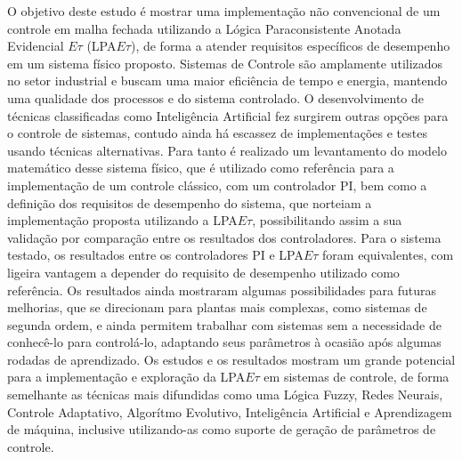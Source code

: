 





O objetivo deste estudo é mostrar uma implementação não convencional
de um controle em malha fechada utilizando a Lógica Paraconsistente
Anotada Evidencial $E\tau$ (LPA$E\tau$),
de forma a atender requisitos específicos de desempenho em um sistema físico proposto.
Sistemas de Controle são amplamente utilizados no setor industrial e
buscam uma maior eficiência de tempo e energia, mantendo uma qualidade
dos processos e do sistema controlado.
O desenvolvimento de técnicas classificadas como Inteligência
Artificial fez surgirem outras opções para o controle de sistemas,
contudo ainda há escassez de implementações e testes usando técnicas alternativas.
Para tanto é realizado um levantamento do modelo matemático desse
sistema físico, que é utilizado como referência para a implementação de um
controle clássico, com um controlador PI, bem como a definição dos
requisitos de desempenho do sistema, que norteiam a implementação
proposta utilizando a LPA$E\tau$, possibilitando assim a sua validação
por comparação entre os resultados dos controladores. 
Para o sistema testado,
os resultados entre os controladores
PI e LPA$E\tau$ foram equivalentes,
com ligeira vantagem a depender do
requisito de desempenho utilizado como referência.
Os resultados ainda mostraram algumas
possibilidades para futuras melhorias,
que se direcionam para plantas mais complexas,
como sistemas de segunda ordem,
e ainda permitem trabalhar com sistemas
sem a necessidade de conhecê-lo para controlá-lo,
adaptando seus parâmetros à ocasião
após algumas rodadas de aprendizado.
Os estudos e os resultados mostram um grande potencial para a
implementação e exploração da LPA$E\tau$ em sistemas de controle, de forma
semelhante as técnicas mais difundidas como uma Lógica Fuzzy, Redes
Neurais, Controle Adaptativo, Algorítmo Evolutivo, Inteligência
Artificial e Aprendizagem de máquina, inclusive
utilizando-as como suporte de geração de parâmetros de controle.



